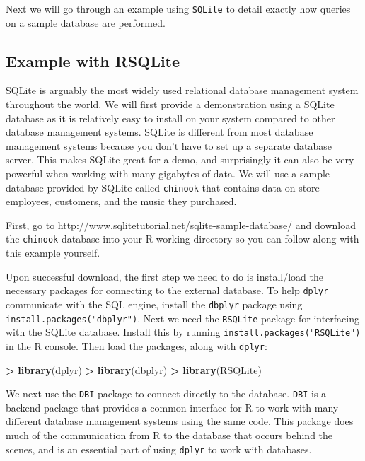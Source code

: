 \documentclass[
]{krantz}
\makeatletter
\newenvironment{Shaded}{\begin{snugshade}}{\end{snugshade}}
\newcommand{\KeywordTok}[1]{\textcolor[rgb]{0.27,0.27,0.27}{\textbf{#1}}}
\newcommand{\NormalTok}[1]{#1}
\newcommand{\OperatorTok}[1]{\textcolor[rgb]{0.43,0.43,0.43}{\textbf{#1}}}
\newcommand{\StringTok}[1]{\textcolor[rgb]{0.5,0.5,0.5}{#1}}
\newenvironment{kframe}{%
\medskip{}
\setlength{\fboxsep}{.8em}
 \def\at@end@of@kframe{}%
 \ifinner\ifhmode%
  \def\at@end@of@kframe{\end{minipage}}%
  \begin{minipage}{\columnwidth}%
 \fi\fi%
 \def\FrameCommand##1{\hskip\@totalleftmargin \hskip-\fboxsep
 \colorbox{shadecolor}{##1}\hskip-\fboxsep
     \hskip-\linewidth \hskip-\@totalleftmargin \hskip\columnwidth}%
 \MakeFramed {\advance\hsize-\width
   \@totalleftmargin\z@ \linewidth\hsize
   \@setminipage}}%
 {\par\unskip\endMakeFramed%
 \at@end@of@kframe}
\renewenvironment{Shaded}{\begin{kframe}}{\end{kframe}}
\makeatother
\begin{document}
Next we will go through an example using \texttt{SQLite} to detail exactly how queries on a sample database are performed.

\hypertarget{example-with-rsqlite}{%
\subsection{Example with RSQLite}\label{example-with-rsqlite}}

SQLite is arguably the most widely used relational database management system throughout the world. We will first provide a demonstration using a SQLite database as it is relatively easy to install on your system compared to other database management systems. SQLite is different from most database management systems because you don't have to set up a separate database server. This makes SQLite great for a demo, and surprisingly it can also be very powerful when working with many gigabytes of data. We will use a sample database provided by SQLite called \texttt{chinook} that contains data on store employees, customers, and the music they purchased.

First, go to \url{http://www.sqlitetutorial.net/sqlite-sample-database/} and download the \texttt{chinook} database into your R working directory so you can follow along with this example yourself.

Upon successful download, the first step we need to do is install/load the necessary packages for connecting to the external database. To help \texttt{dplyr} communicate with the SQL engine, install the \texttt{dbplyr} package using \texttt{install.packages("dbplyr")}. Next we need the \texttt{RSQLite} package for interfacing with the SQLite database. Install this by running \texttt{install.packages("RSQLite")} in the R console. Then load the packages, along with \texttt{dplyr}:

\begin{Shaded}
\begin{Highlighting}[]
\OperatorTok{\textgreater{}}\StringTok{ }\KeywordTok{library}\NormalTok{(dplyr)}
\OperatorTok{\textgreater{}}\StringTok{ }\KeywordTok{library}\NormalTok{(dbplyr)}
\OperatorTok{\textgreater{}}\StringTok{ }\KeywordTok{library}\NormalTok{(RSQLite)}
\end{Highlighting}
\end{Shaded}

We next use the \texttt{DBI} package to connect directly to the database. \texttt{DBI} is a backend package that provides a common interface for R to work with many different database management systems using the same code. This package does much of the communication from R to the database that occurs behind the scenes, and is an essential part of using \texttt{dplyr} to work with databases.
\end{document}
